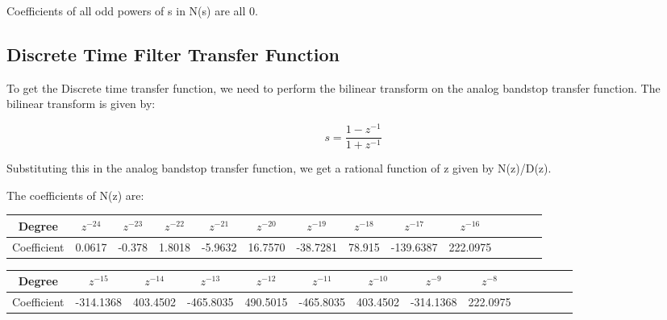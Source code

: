 \documentclass{article}
\begin{document}
Coefficients of all odd powers of s in N(s) are all 0.

\subsection{Discrete Time Filter Transfer Function}

To get the Discrete time transfer function, we need to perform the bilinear transform on the analog  bandstop transfer function.
The bilinear transform is given by:
\vspace{-5mm}
\begin{center}
    \begin{equation*}
        s = \frac{1-z^{-1}}{1+z^{-1}}
    \end{equation*}
\end{center}

Substituting this in the analog bandstop transfer function, we get a rational function of z given by N(z)/D(z).

The coefficients of N(z) are:

\begin{table}[H]
		\begin{center}
		\begin{tabular}{|c|c|c|c|c|c|c|c|c|c|c|c|c|c|}
			\hline
			Degree & $z^{-24}$ & $z^{-23}$ & $z^{-22}$  & $z^{-21}$ & $z^{-20}$ & $z^{-19}$ & $z^{-18}$ & $z^{-17}$ & $z^{-16}$\\
			
			\hline
                Coefficient & 0.0617 & -0.378 & 1.8018  & -5.9632 & 16.7570 & -38.7281 & 78.915 & -139.6387 & 222.0975 \\
                \hline
            
		\end{tabular}
		\end{center}
\end{table}

\begin{table}[H]
		\begin{center}
		\begin{tabular}{|c|c|c|c|c|c|c|c|c|c|c|c|c|c|}
			\hline
			Degree &  $z^{-15}$ & $z^{-14}$  & $z^{-13}$ & $z^{-12}$ & $z^{-11}$ & $z^{-10}$ & $z^{-9}$ & $z^{-8}$ \\
			
			\hline
                Coefficient  & -314.1368 & 403.4502 & -465.8035 & 490.5015 & -465.8035 & 403.4502 & -314.1368 & 222.0975 \\
                \hline
            
		\end{tabular}
		\end{center}
\end{table}
\end{document}
